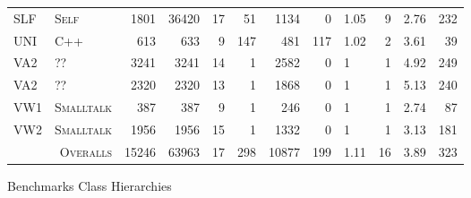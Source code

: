 \begin{figure}[htbp]
\begin{tabular}{@{ }l@{ }||@{ }l@{ }|@{ }r@{ }|@{ }r@{ }|@{ }r@{ }|@{ }r@{ }|@{ }r@{ }|@{ }r@{ }|@{ }l@{ }|@{ }r@{ }|@{ }r@{ }|@{ }r@{ }}
 SLF & \tiny{\textsc{Self}}        & 1801 & 36420 & 17 &  51 & 1134 &   0 & 1.05 &  9 & 2.76 & 232 \\ %
 UNI & \tiny{\textsc{C++}}         &  613 &   633 &  9 & 147 &  481 & 117 & 1.02 &  2 & 3.61 &  39 \\ %
 VA2 & \tiny{\textsc{??}}          & 3241 &  3241 & 14 &   1 & 2582 &   0 & 1    &  1 & 4.92 & 249 \\ %
 VA2 & \tiny{\textsc{??}}          & 2320 &  2320 & 13 &   1 & 1868 &   0 & 1    &  1 & 5.13 & 240 \\ %
 VW1 & \tiny{\textsc{Smalltalk}}   &  387 &   387 &  9 &   1 &  246 &   0 & 1    &  1 & 2.74 &  87 \\ %
 VW2 & \tiny{\textsc{Smalltalk}}   & 1956 &  1956 & 15 &   1 & 1332 &   0 & 1    &  1 & 3.13 & 181 \\ %
\hline %
\multicolumn{2}{r|}{\tiny{\textsc{Overalls}}} &15246 & 63963 & 17 & 298 &10877 & 199 & 1.11 & 16 & 3.89 & 323 \\ %
\hline %
\end{tabular}
\caption{Benchmarks Class Hierarchies}
\label{fig:benchmarks}
\end{figure}

